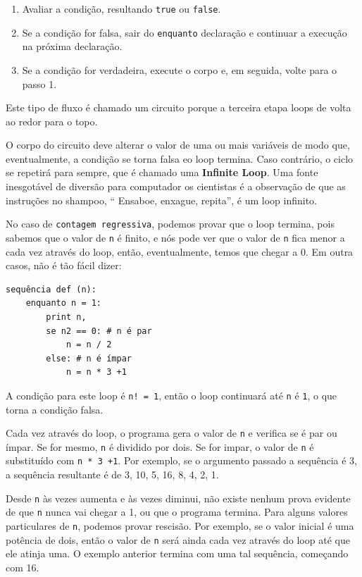 \documentclass[10pt]{book}
\begin{document}
{{\begin{enumerate}

\item Avaliar a condição, resultando {\tt true} ou {\tt false}.

\item Se a condição for falsa, sair do {\tt enquanto} declaração
e continuar a execução na próxima declaração.

\item Se a condição for verdadeira, execute o
corpo e, em seguida, volte para o passo 1.

\end{enumerate}

Este tipo de fluxo é chamado um circuito {\bf} porque a terceira etapa
loops de volta ao redor para o topo.  

O corpo do circuito deve alterar o valor de uma ou mais variáveis
de modo que, eventualmente, a condição se torna falsa eo loop
termina. Caso contrário, o ciclo se repetirá para sempre, que é chamado
uma {\bf Infinite Loop}. Uma fonte inesgotável de diversão para computador
os cientistas é a observação de que as instruções no shampoo,
`` Ensaboe, enxague, repita'', é um loop infinito.

No caso de {\tt contagem regressiva}, podemos provar que o loop
termina, pois sabemos que o valor de {\tt n} é finito, e nós
pode ver que o valor de {\tt n} fica menor a cada vez através do
loop, então, eventualmente, temos que chegar a 0. Em outra
casos, não é tão fácil dizer:

\begin{verbatim}
sequência def (n):
    enquanto n = 1:
        print n,
        se n2 == 0: # n é par
            n = n / 2
        else: # n é ímpar
            n = n * 3 +1
\end{verbatim}
%
A condição para este loop é {\tt n! = 1}, então o loop continuará
até {\tt n} é {\tt 1}, o que torna a condição falsa.

Cada vez através do loop, o programa gera o valor de {\tt n}
e verifica se é par ou ímpar. Se for mesmo, {\tt n} é
dividido por dois. Se for impar, o valor de {\tt n} é substituído com
{\tt n * 3 +1}. Por exemplo, se o argumento passado
a sequência {\tt} é 3, a sequência resultante é de 3, 10, 5, 16, 8, 4, 2, 1.

Desde {\tt n} às vezes aumenta e às vezes diminui, não existe nenhum
prova evidente de que {\tt n} nunca vai chegar a 1, ou que o programa
termina. Para alguns valores particulares de {\tt n}, podemos provar
rescisão. Por exemplo, se o valor inicial é uma potência de dois,
então o valor de {\tt n} será ainda cada vez através do loop
até que ele atinja uma. O exemplo anterior termina com uma tal sequência,
começando com 16.

}}
\end{document}
